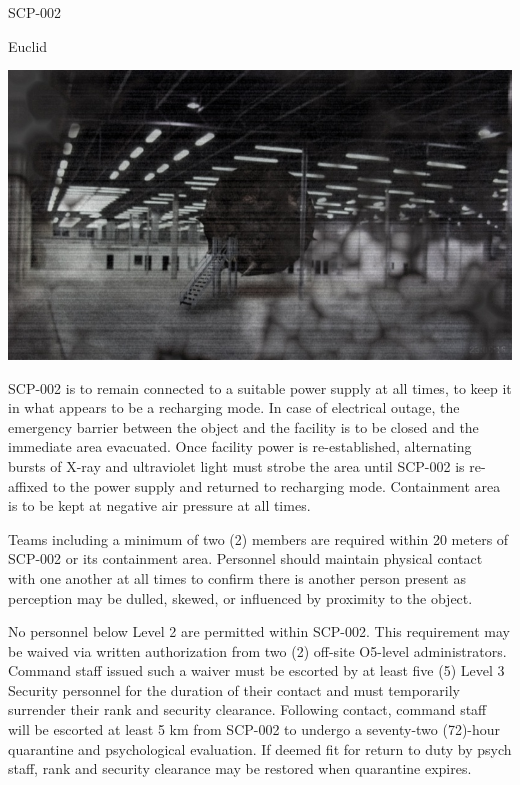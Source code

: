  SCP-002

 Euclid

\begin{center}
\includegraphics[scale=0.3]{scp/002.jpg}
\end{center}

 SCP-002 is to remain connected to a suitable power supply at all times, to keep it in what appears to be a recharging mode. In case of electrical outage, the emergency barrier between the object and the facility is to be closed and the immediate area evacuated. Once facility power is re-established, alternating bursts of X-ray and ultraviolet light must strobe the area until SCP-002 is re-affixed to the power supply and returned to recharging mode. Containment area is to be kept at negative air pressure at all times.

Teams including a minimum of two (2) members are required within 20 meters of SCP-002 or its containment area. Personnel should maintain physical contact with one another at all times to confirm there is another person present as perception may be dulled, skewed, or influenced by proximity to the object.

No personnel below Level 2 are permitted within SCP-002. This requirement may be waived via written authorization from two (2) off-site O5-level administrators. Command staff issued such a waiver must be escorted by at least five (5) Level 3 Security personnel for the duration of their contact and must temporarily surrender their rank and security clearance. Following contact, command staff will be escorted at least 5 km from SCP-002 to undergo a seventy-two (72)-hour quarantine and psychological evaluation. If deemed fit for return to duty by psych staff, rank and security clearance may be restored when quarantine expires.

